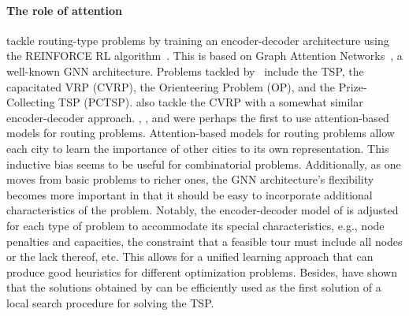 \documentclass[twoside,11pt]{article}
\newcommand{\cm}[1]{{{\textcolor{orange}{\textbf{[CM:} {#1}\textbf{]}}}}}
\newcommand{\ek}[1]{{{\textcolor{blue}{\textbf{[EK:} {#1}\textbf{]}}}}}
\begin{document}

\paragraph{The role of attention}
\citet{kool2018attention} tackle routing-type problems by training an encoder-decoder architecture using the REINFORCE RL algorithm~\citep{sutton1999policy}. This is based on Graph Attention Networks~\citep{Vel+2018}, a well-known GNN architecture. Problems tackled by~\citet{kool2018attention} include the TSP, the capacitated VRP (CVRP), the Orienteering Problem (OP), and the Prize-Collecting TSP (PCTSP). \citet{nazari2018reinforcement} also tackle the CVRP with a somewhat similar encoder-decoder approach.
\citet{deudon2018learning}, \citet{nazari2018reinforcement}, and \citet{kool2018attention} were perhaps the first to use attention-based models for routing problems. Attention-based models for routing problems allow each city to learn the importance of other cities to its own representation. This inductive bias seems to be useful for combinatorial problems. Additionally, as one moves from basic problems to richer ones, the GNN architecture's flexibility becomes more important in that it should be easy to incorporate additional characteristics of the problem. Notably, the encoder-decoder model of \cite{kool2018attention} is adjusted for each type of problem to accommodate its special characteristics, e.g., node penalties and capacities, the constraint that a feasible tour must include all nodes or the lack thereof, etc. This allows for a unified learning approach that can produce good heuristics for different optimization problems. Besides, \citet{franccois2019evaluate} have shown that the solutions obtained by \citet{deudon2018learning,kool2018attention,joshi2019efficient,Khalil2017} can be efficiently used as the first solution of a local search procedure for solving the TSP.
\end{document}
